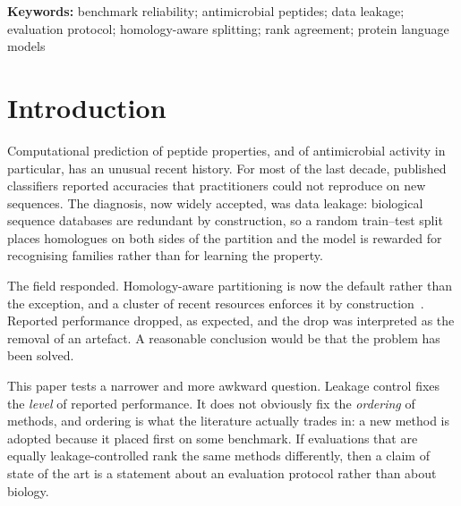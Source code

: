 \documentclass[11pt,a4paper]{article}
\begin{document}
\noindent\textbf{Keywords:} benchmark reliability; antimicrobial peptides; data leakage;
evaluation protocol; homology-aware splitting; rank agreement; protein language models

\section{Introduction}

Computational prediction of peptide properties, and of antimicrobial activity in
particular, has an unusual recent history. For most of the last decade, published
classifiers reported accuracies that practitioners could not reproduce on new sequences.
The diagnosis, now widely accepted, was data leakage: biological sequence databases are
redundant by construction, so a random train--test split places homologues on both sides of
the partition and the model is rewarded for recognising families rather than for learning
the property.

The field responded. Homology-aware partitioning is now the default rather than the
exception, and a cluster of recent resources enforces it by
construction~\citep{sidorczuk2022negative,fernandezdiaz2024autopeptideml,ferrerflorensa2024spanseq,lavertu2026qmap,dong2026ppb,pham2026genpept}.
Reported performance dropped, as expected, and the drop was interpreted as the removal of
an artefact. A reasonable conclusion would be that the problem has been solved.

This paper tests a narrower and more awkward question. Leakage control fixes the
\emph{level} of reported performance. It does not obviously fix the \emph{ordering} of
methods, and ordering is what the literature actually trades in: a new method is adopted
because it placed first on some benchmark. If evaluations that are equally
leakage-controlled rank the same methods differently, then a claim of state of the art is a
statement about an evaluation protocol rather than about biology.
\end{document}
